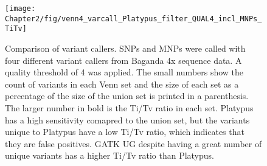\begin{figure}
\centering
\texttt{[image: Chapter2/fig/venn4\_varcall\_Platypus\_filter\_QUAL4\_incl\_MNPs\_TiTv]}
\caption{Comparison of variant callers. SNPs and MNPs were called with four different variant callers from Baganda 4x sequence data. A quality threshold of 4 was applied. The small numbers show the count of variants in each Venn set and the size of each set as a percentage of the size of the union set is printed in a parenthesis. The larger number in bold is the Ti/Tv ratio in each set. Platypus has a high sensitivity comapred to the union set, but the variants unique to Platypus have a low Ti/Tv ratio, which indicates that they are false positives. \gls{GATK} \gls{UG} despite having a great number of unique variants has a higher Ti/Tv ratio than Platypus.}
\label{fig:venn4_varcall_Platypus_filter_QUAL4_incl_MNPs_TiTv}
\end{figure}